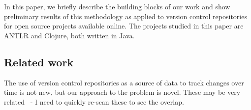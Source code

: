 In this paper, we briefly describe the building blocks of our work and show
preliminary results of this methodology as applied to version control
repositories for open source projects available online.  The projects studied
in this paper are ANTLR and Clojure, both written in Java.

\subsection{Related work}

The use of version control repositories as a source of data to track changes
over time is not new, but our approach to the problem is novel. 
These may be very
related~\cite{weissgerber06identify, kim07automatic, neamtiu05understand} - I
need to quickly re-scan these to see the overlap.  